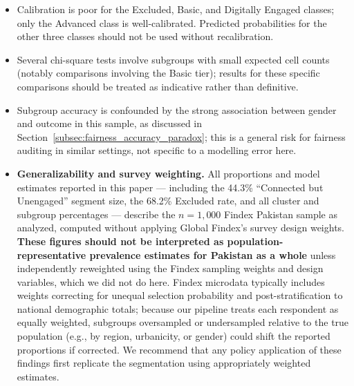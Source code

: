 \documentclass[conference]{IEEEtran}
\begin{document}
\begin{itemize}
justified (Section~\ref{subsec:cluster_validation_results}) but is not a dramatically better geometric fit
than $k=2$ by silhouette score alone; see Section~\ref{subsec:cluster_validation_results} for the explicit
distinction we draw between analytical usefulness and natural population
separation.
\item Calibration is poor for the Excluded, Basic, and Digitally Engaged classes; only the Advanced class is well-calibrated. Predicted probabilities for the other three classes should not be used without recalibration.
\item Several chi-square tests involve subgroups with small expected cell counts (notably comparisons involving the Basic tier); results for these specific comparisons should be treated as indicative rather than definitive.
\item Subgroup accuracy is confounded by the strong association between gender and outcome in this sample, as discussed in Section~\ref{subsec:fairness_accuracy_paradox}; this is a general risk for fairness auditing in similar settings, not specific to a modelling error here.
\item \textbf{Generalizability and survey weighting.} All proportions and
model estimates reported in this paper --- including the 44.3\%
``Connected but Unengaged'' segment size, the 68.2\% Excluded rate, and
all cluster and subgroup percentages --- describe the $n=1{,}000$ Findex
Pakistan sample as analyzed, computed without applying Global Findex's
survey design weights. \textbf{These figures should not be interpreted
as population-representative prevalence estimates for Pakistan as a
whole} unless independently reweighted using the Findex sampling weights
and design variables, which we did not do here. Findex microdata
typically includes weights correcting for unequal selection probability
and post-stratification to national demographic totals; because our
pipeline treats each respondent as equally weighted, subgroups
oversampled or undersampled relative to the true population (e.g., by
region, urbanicity, or gender) could shift the reported proportions if
corrected. We recommend that any policy application of these findings
first replicate the segmentation using appropriately weighted estimates.
\end{itemize}
 
\end{document}
